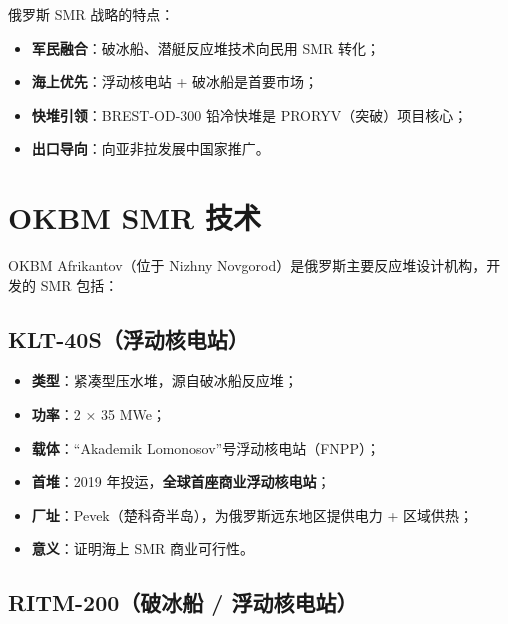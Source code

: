 \documentclass[
  UTF8,
  scheme=plain,
  fontsize=10pt,
  openany
]{ctexbook}
\begin{document}
俄罗斯 SMR 战略的特点：

\begin{itemize}
\tightlist
\item
  \textbf{军民融合}：破冰船、潜艇反应堆技术向民用 SMR 转化；
\item
  \textbf{海上优先}：浮动核电站 + 破冰船是首要市场；
\item
  \textbf{快堆引领}：BREST-OD-300 铅冷快堆是 PRORYV（突破）项目核心；
\item
  \textbf{出口导向}：向亚非拉发展中国家推广。
\end{itemize}

\section{OKBM SMR 技术}\label{okbm-smr-ux6280ux672f}

OKBM Afrikantov（位于 Nizhny
Novgorod）是俄罗斯主要反应堆设计机构，开发的 SMR 包括：

\subsection{KLT-40S（浮动核电站）}\label{klt-40sux6d6eux52a8ux6838ux7535ux7ad9}

\begin{itemize}
\tightlist
\item
  \textbf{类型}：紧凑型压水堆，源自破冰船反应堆；
\item
  \textbf{功率}：2 × 35 MWe；
\item
  \textbf{载体}：``Akademik Lomonosov''号浮动核电站（FNPP）；
\item
  \textbf{首堆}：2019 年投运，\textbf{全球首座商业浮动核电站}；
\item
  \textbf{厂址}：Pevek（楚科奇半岛），为俄罗斯远东地区提供电力 +
  区域供热；
\item
  \textbf{意义}：证明海上 SMR 商业可行性。
\end{itemize}

\subsection{RITM-200（破冰船 /
浮动核电站）}\label{ritm-200ux7834ux51b0ux8239-ux6d6eux52a8ux6838ux7535ux7ad9}
\end{document}
